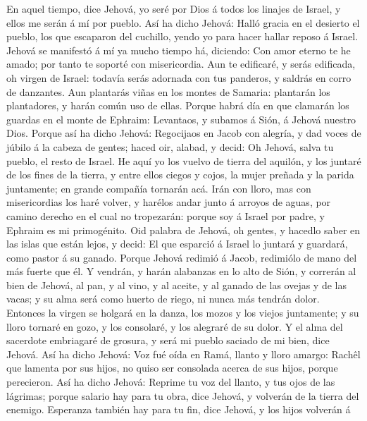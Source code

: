  En aquel tiempo, dice Jehová, yo seré por Dios á todos
los linajes de Israel, y ellos me serán á mí por pueblo. 
Así ha dicho Jehová: Halló gracia en el desierto el pueblo, los que
escaparon del cuchillo, yendo yo para hacer hallar reposo á Israel.
 Jehová se manifestó á mí ya mucho tiempo há, diciendo:
Con amor eterno te he amado; por tanto te soporté con misericordia.
 Aun te edificaré, y serás edificada, oh virgen de Israel:
todavía serás adornada con tus panderos, y saldrás en corro de
danzantes.  Aun plantarás viñas en los montes de Samaria:
plantarán los plantadores, y harán común uso de ellas. 
Porque habrá día en que clamarán los guardas en el monte de Ephraim:
Levantaos, y subamos á Sión, á Jehová nuestro Dios. 
Porque así ha dicho Jehová: Regocijaos en Jacob con alegría, y dad voces
de júbilo á la cabeza de gentes; haced oir, alabad, y decid: Oh Jehová,
salva tu pueblo, el resto de Israel.  He aquí yo los
vuelvo de tierra del aquilón, y los juntaré de los fines de la tierra, y
entre ellos ciegos y cojos, la mujer preñada y la parida juntamente; en
grande compañía tornarán acá.  Irán con lloro, mas con
misericordias los haré volver, y harélos andar junto á arroyos de aguas,
por camino derecho en el cual no tropezarán: porque soy á Israel por
padre, y Ephraim es mi primogénito.  Oid palabra de
Jehová, oh gentes, y hacedlo saber en las islas que están lejos, y
decid: El que esparció á Israel lo juntará y guardará, como pastor á su
ganado.  Porque Jehová redimió á Jacob, redimiólo de mano
del más fuerte que él.  Y vendrán, y harán alabanzas en
lo alto de Sión, y correrán al bien de Jehová, al pan, y al vino, y al
aceite, y al ganado de las ovejas y de las vacas; y su alma será como
huerto de riego, ni nunca más tendrán dolor.  Entonces la
virgen se holgará en la danza, los mozos y los viejos juntamente; y su
lloro tornaré en gozo, y los consolaré, y los alegraré de su dolor.
 Y el alma del sacerdote embriagaré de grosura, y será mi
pueblo saciado de mi bien, dice Jehová.  Así ha dicho
Jehová: Voz fué oída en Ramá, llanto y lloro amargo: Rachêl que lamenta
por sus hijos, no quiso ser consolada acerca de sus hijos, porque
perecieron.  Así ha dicho Jehová: Reprime tu voz del
llanto, y tus ojos de las lágrimas; porque salario hay para tu obra,
dice Jehová, y volverán de la tierra del enemigo. 
Esperanza también hay para tu fin, dice Jehová, y los hijos volverán á
